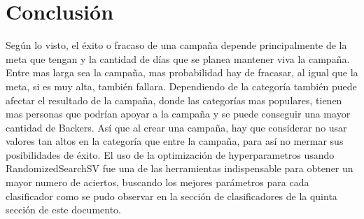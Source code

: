 \documentclass[journal]{IEEEtran}
\begin{document}
%






\section{Conclusión}
Según lo visto, el éxito o fracaso de una campaña depende principalmente de la meta que tengan y la cantidad de días que se planea mantener viva la campaña. Entre mas larga sea la campaña, mas probabilidad hay de fracasar, al igual que la meta, si es muy alta, también fallara. Dependiendo de la categoría también puede afectar el resultado de la campaña, donde las categorías mas populares, tienen mas personas que podrían apoyar a la campaña y se puede conseguir una mayor cantidad de Backers. Así que al crear una campaña, hay que considerar no usar valores tan altos en la categoría que entre la campaña, para así no mermar sus posibilidades de éxito.
El uso de la optimización de hyperparametros usando RandomizedSearchSV fue una de las herramientas indispensable para obtener un mayor numero de aciertos, buscando los mejores parámetros para cada clasificador como se pudo observar en la sección de clasificadores de la quinta sección de este documento.
\end{document}
